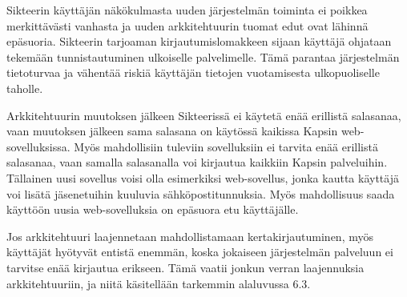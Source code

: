 Sikteerin käyttäjän näkökulmasta uuden järjestelmän toiminta ei poikkea merkittävästi vanhasta ja uuden arkkitehtuurin tuomat edut ovat lähinnä epäsuoria. Sikteerin tarjoaman kirjautumislomakkeen sijaan käyttäjä ohjataan tekemään tunnistautuminen ulkoiselle palvelimelle. Tämä parantaa järjestelmän tietoturvaa ja vähentää riskiä käyttäjän tietojen vuotamisesta ulkopuoliselle taholle.

Arkkitehtuurin muutoksen jälkeen Sikteerissä ei käytetä enää erillistä salasanaa, vaan muutoksen jälkeen sama salasana on käytössä kaikissa Kapsin web-sovelluksissa. Myös mahdollisiin tuleviin sovelluksiin ei tarvita enää erillistä salasanaa, vaan samalla salasanalla voi kirjautua kaikkiin Kapsin palveluihin. Tällainen uusi sovellus voisi olla esimerkiksi web-sovellus, jonka kautta käyttäjä voi lisätä jäsenetuihin kuuluvia sähköpostitunnuksia. Myös mahdollisuus saada käyttöön uusia web-sovelluksia on epäsuora etu käyttäjälle.

Jos arkkitehtuuri laajennetaan mahdollistamaan kertakirjautuminen, myös käyttäjät hyötyvät entistä enemmän, koska jokaiseen järjestelmän palveluun ei tarvitse enää kirjautua erikseen. Tämä vaatii jonkun verran laajennuksia arkkitehtuuriin, ja niitä käsitellään tarkemmin alaluvussa 6.3.